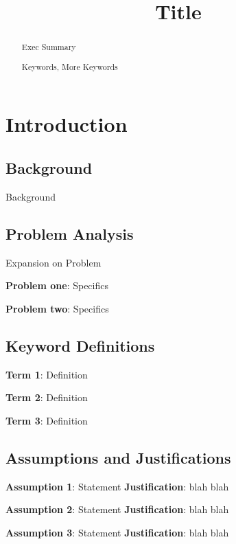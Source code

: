 \documentclass{mcm}
\title{Title}
\numberwithin{figure}{section}
\numberwithin{table}{section}
\numberwithin{equation}{section}
\begin{document}
    \begin{abstract}
        Exec Summary

        \begin{keywords}
            Keywords, More Keywords
        \end{keywords}

    \end{abstract}

    \maketitle
    \tableofcontents
    \newpage


    \section{Introduction}

    \subsection{Background}
    Background

    \subsection{Problem Analysis}
    Expansion on Problem

    \noindent\textbf{Problem one}: Specifics

    \noindent\textbf{Problem two}: Specifics

    \subsection{Keyword Definitions}
    \noindent\textbf{Term 1}: Definition

    \noindent\textbf{Term 2}: Definition

    \noindent\textbf{Term 3}: Definition

    \subsection{Assumptions and Justifications}
    \noindent\textbf{Assumption 1}: Statement
    \textbf{Justification}: blah blah

    \noindent\textbf{Assumption 2}: Statement
    \textbf{Justification}: blah blah

    \noindent\textbf{Assumption 3}: Statement
    \textbf{Justification}: blah blah
\end{document}
